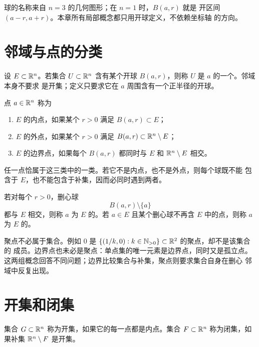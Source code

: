 球的名称来自 \(n=3\) 的几何图形；在 \(n=1\) 时，\(B(a,r)\) 就是
开区间 \((a-r,a+r)\)。本章所有局部概念都只用开球定义，不依赖坐标轴
的方向。

\section{邻域与点的分类}

设 \(E\subset\mathbb{R}^n\)。若集合 \(U\subset\mathbb{R}^n\) 含有某个开球
\(B(a,r)\)，则称 \(U\) 是 \(a\) 的一个。邻域本身不要求
是开集；定义只要求它在 \(a\) 周围含有一个正半径的开球。

\begin{definition}[内点、外点、边界点]
点 \(a\in\mathbb{R}^n\) 称为
\begin{enumerate}[label=\textup{(\roman*)}]
 \item \(E\) 的内点，如果某个 \(r>0\) 满足 \(B(a,r)\subset E\)；
 \item \(E\) 的外点，如果某个 \(r>0\) 满足
 \(B(a,r)\subset\mathbb{R}^n\setminus E\)；
 \item \(E\) 的边界点，如果每个 \(B(a,r)\) 都同时与 \(E\) 和
 \(\mathbb{R}^n\setminus E\) 相交。
\end{enumerate}
\end{definition}

任一点恰属于这三类中的一类。若它不是内点，也不是外点，则每个球既不能
包含于 \(E\)，也不能包含于补集，因而必同时遇到两者。

\begin{definition}[聚点与孤立点]
若对每个 \(r>0\)，删心球
\[
 B(a,r)\setminus\{a\}
\]
都与 \(E\) 相交，则称 \(a\) 为 \(E\) 的。若
\(a\in E\) 且某个删心球不再含 \(E\) 中的点，则称 \(a\) 为 \(E\)
的。
\end{definition}

聚点不必属于集合。例如 \(0\) 是
\(\{(1/k,0):k\in\mathbb{N}_{>0}\}\subset\mathbb{R}^2\) 的聚点，却不是该集合的
成员。边界点也未必是聚点：单点集的唯一元素是边界点，同时又是孤立点。
这两组概念回答不同问题；边界比较集合与补集，聚点则要求集合自身在删心
邻域中反复出现。

\section{开集和闭集}

\begin{definition}[开集与闭集]
集合 \(G\subset\mathbb{R}^n\) 称为开集，如果它的每一点都是内点。集合
\(F\subset\mathbb{R}^n\) 称为闭集，如果补集 \(\mathbb{R}^n\setminus F\) 是开集。
\end{definition}

